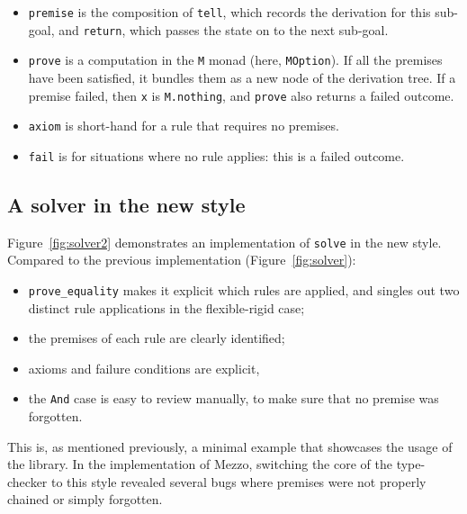 \documentclass{easychair}
\def\li{\lstinline}
\newcommand{\fref}[1]{Figure~\ref{fig:#1}}
\begin{document}
\begin{itemize}

  \item \li+premise+ is the composition of \li+tell+, which records the
    derivation for this sub-goal, and \li+return+, which passes the state on to
    the next sub-goal.

  \item \li+prove+ is a computation in the \li+M+ monad (here, \li+MOption+). If
    all the premises have been satisfied, it bundles them as a new node of the
    derivation tree. If a premise failed, then \li+x+ is \li+M.nothing+, and
    \li+prove+ also returns a failed outcome.

  \item \li+axiom+ is short-hand for a rule that requires no premises.

  \item \li+fail+ is for situations where no rule applies: this is a failed outcome.
\end{itemize}

\subsection{A solver in the new style}

\fref{solver2} demonstrates an implementation of \li+solve+ in the new style.
Compared to the previous implementation (\fref{solver}):
\begin{itemize}
  \item \li+prove_equality+ makes it explicit which rules are applied, and
    singles out two distinct rule applications in the flexible-rigid case;
  \item the premises of each rule are clearly identified;
  \item axioms and failure conditions are explicit,
  \item the \li+And+ case is easy to review manually, to make sure that no
    premise was forgotten.
\end{itemize}
This is, as mentioned previously, a minimal example that showcases the usage of
the library. In the implementation of Mezzo, switching the core of the
type-checker to this style revealed several bugs where premises were not
properly chained or simply forgotten.
\end{document}

